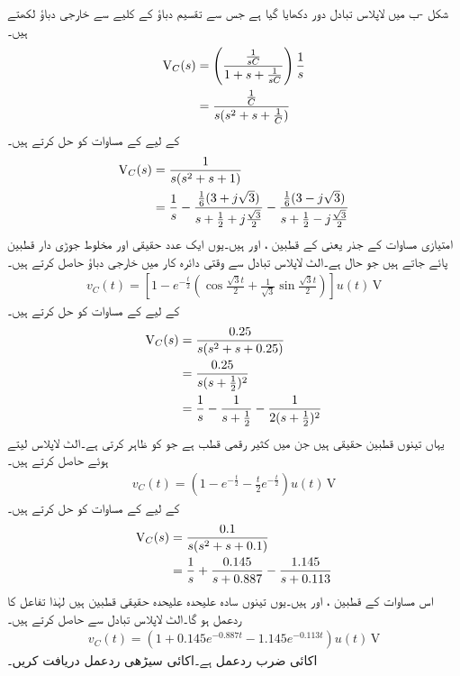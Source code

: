 شکل -ب میں لاپلاس تبادل دور دکھایا گیا ہے جس سے تقسیم دباؤ کے کلیے سے خارجی دباؤ لکھتے ہیں۔
\begin{align*}
{\ensuremath{{\textup{V}}}}_C(s)&=\left(\frac{\frac{1}{sC}}{1+s+\frac{1}{sC}}\right)\frac{1}{s}\\
&=\frac{\frac{1}{C}}{s(s^2+s+\frac{1}{C})}
\end{align*}
  کے لیے  کے مساوات کو حل کرتے ہیں۔
\begin{align*}
{\ensuremath{{\textup{V}}}}_C(s)&=\frac{1}{s(s^2+s+1)}\\
&=\frac{1}{s}-\frac{\frac{1}{6}(3+j\sqrt{3})}{s+\frac{1}{2}+j\frac{\sqrt{3}}{2}}-\frac{\frac{1}{6}(3-j\sqrt{3})}{s+\frac{1}{2}-j\frac{\sqrt{3}}{2}}
\end{align*}
امتیازی مساوات کے جذر یعنی  کے قطبین ،  اور
  ہیں۔یوں ایک عدد حقیقی اور مخلوط جوڑی دار قطبین پائے جاتے ہیں جو  حال ہے۔الٹ لاپلاس تبادل سے وقتی دائرہ کار میں خارجی دباؤ حاصل کرتے ہیں۔
\begin{align*}
v_C(t)=\left[1-e^{-\frac{t}{2}}\left(\cos \frac{\sqrt{3}t}{2}+\frac{1}{\sqrt{3}}\sin\frac{\sqrt{3}t}{2}\right)\right]u(t)\,\si{\volt}
\end{align*}
  کے لیے  کے مساوات کو حل کرتے ہیں۔
\begin{align*}
{\ensuremath{{\textup{V}}}}_C(s)&=\frac{0.25}{s(s^2+s+0.25)}\\
&=\frac{0.25}{s(s+\frac{1}{2})^2}\\
&=\frac{1}{s}-\frac{1}{s+\frac{1}{2}}-\frac{1}{2(s+\frac{1}{2})^2}
\end{align*}
یہاں تینوں قطبین حقیقی ہیں جن میں  کثیر رقمی قطب ہے جو  کو ظاہر کرتی ہے۔الٹ لاپلاس لیتے ہوئے  حاصل  کرتے ہیں۔
\begin{align*}
v_C(t)=\left(1-e^{-\frac{t}{2}}-\frac{t}{2}e^{-\frac{t}{2}}\right)u(t) \,\si{\volt}
\end{align*}
  کے لیے  کے مساوات کو حل کرتے ہیں۔
\begin{align*}
{\ensuremath{{\textup{V}}}}_C(s)&=\frac{0.1}{s(s^2+s+0.1)}\\
&=\frac{1}{s}+\frac{0.145}{s+0.887}-\frac{1.145}{s+0.113}
\end{align*}
اس مساوات کے قطبین ،  اور  ہیں۔یوں تینوں سادہ علیحدہ علیحدہ حقیقی قطبین ہیں لہٰذا تفاعل کا ردعمل  ہو گا۔الٹ لاپلاس تبادل سے  حاصل کرتے ہیں۔
\begin{align*}
v_C(t)=\left(1+0.145e^{-0.887t}-1.145e^{-0.113t}\right)u(t)\,\si{\volt}
\end{align*}
اکائی ضرب ردعمل  ہے۔اکائی سیڑھی ردعمل دریافت کریں۔

